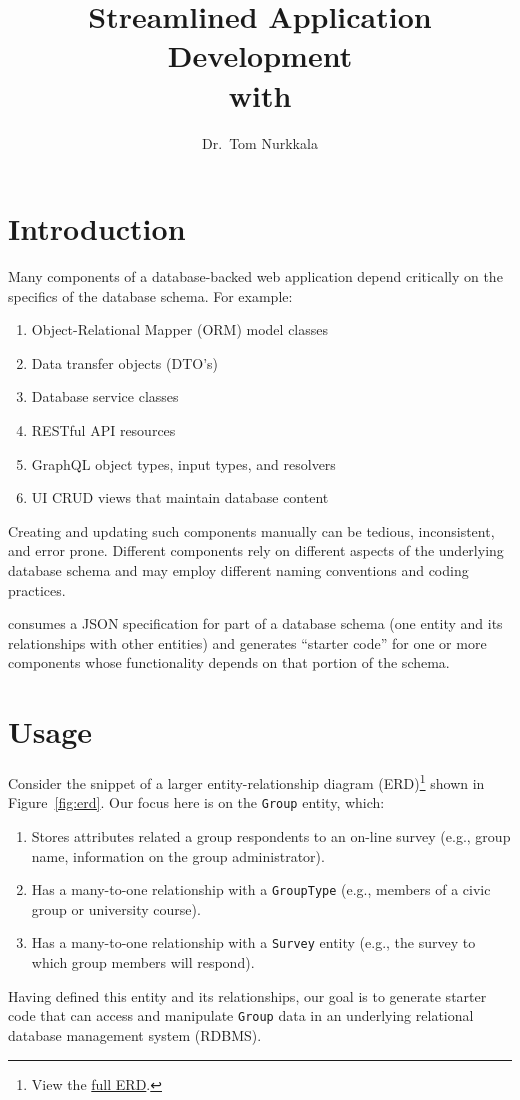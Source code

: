 \documentclass{article}
\title{Streamlined Application Development\\with \boil}
\author{Dr.\ Tom Nurkkala}
\begin{document}
\maketitle
\tableofcontents

\section{Introduction}
\label{sec:introduction}

Many components of a database-backed web application
depend critically
on the specifics of the database schema.
For example:
\begin{enumerate}
\item Object-Relational Mapper (ORM) model classes
\item Data transfer objects (DTO's)
\item Database service classes
\item RESTful API resources
\item GraphQL object types, input types, and resolvers
\item UI CRUD views that maintain database content
\end{enumerate}
Creating
and updating
such components manually
can be tedious, inconsistent, and error prone.
Different components
rely on different aspects
of the underlying database schema
and may employ different naming conventions and
coding practices.

\boil{} consumes a JSON specification
for part of a database schema
(one entity and its relationships with other entities)
and generates ``starter code''
for one or more components whose
functionality depends on that portion of the schema.

\section{Usage}
\label{sec:usage}

Consider the snippet of a larger entity-relationship diagram (ERD)\footnote{View the
  \href{https://lucid.app/lucidchart/3b762a6b-a9f6-46fa-a54c-085f27f5b38d/edit?invitationId=inv_d358a7a6-5094-4a87-be16-4d7b25bad7ad}{full ERD}.}
shown in Figure~\ref{fig:erd}.
Our focus here is on the \texttt{Group} entity, which:
\begin{enumerate}
\item Stores attributes related a group respondents to an on-line survey
  (e.g., group name, information on the group administrator).
\item Has a many-to-one relationship with a \texttt{GroupType}
  (e.g., members of a civic group or university course).
\item Has a many-to-one relationship with a \texttt{Survey} entity
  (e.g., the survey to which group members will respond).
\end{enumerate}
Having defined this entity and its relationships,
our goal is to generate starter code that can 
access and manipulate \texttt{Group} data
in an underlying
relational database management system (RDBMS).
\end{document}

